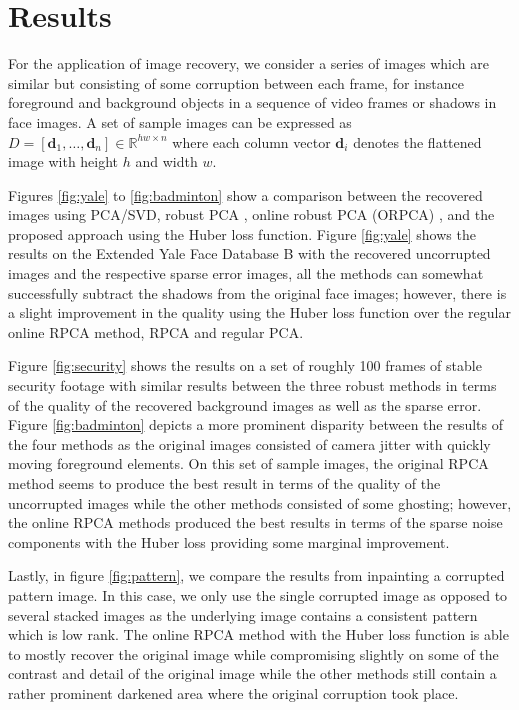 \documentclass[a4paper,11pt]{article}
\newcommand{\real}{\mathbb{R}}
\newcommand{\bd}{\mathbf{d}}
\begin{document}
\section{Results}
For the application of image recovery, we consider a series of images which are
similar but consisting of some corruption between each frame, for instance
foreground and background objects in a sequence of video frames or shadows in
face images. A set of sample images can be expressed as $D = [\bd_1, \dots,
\bd_n] \in \real^{hw \times n}$ where each column vector $\bd_i$ denotes the
flattened image with height $h$ and width $w$.

Figures \ref{fig:yale} to \ref{fig:badminton} show a comparison between the
recovered images using PCA/SVD, robust PCA \cite{NIPS2009}, online robust PCA
(ORPCA) \cite{FengORPCA}, and the proposed approach using the Huber loss
function. Figure \ref{fig:yale} shows the results on the Extended Yale Face
Database B \cite{cryale} with the recovered uncorrupted images and the
respective sparse error images, all the methods can somewhat successfully
subtract the shadows from the original face images; however, there is a slight
improvement in the quality using the Huber loss function over the regular
online RPCA method, RPCA and regular PCA.

Figure \ref{fig:security} shows the results on a set of roughly 100 frames of
stable security footage with similar results between the three robust methods
in terms of the quality of the recovered background images as well as the
sparse error. Figure \ref{fig:badminton} depicts a more prominent disparity
between the results of the four methods as the original images consisted of
camera jitter with quickly moving foreground elements. On this set of sample
images, the original RPCA method seems to produce the best result in terms of
the quality of the uncorrupted images while the other methods consisted of some
ghosting; however, the online RPCA methods produced the best results in terms
of the sparse noise components with the Huber loss providing some marginal
improvement.

Lastly, in figure \ref{fig:pattern}, we compare the results from inpainting a 
corrupted pattern image. In this case, we only use the single corrupted image 
as opposed to several stacked images as the underlying image contains a
consistent pattern which is low rank. The online RPCA method with the
Huber loss function is able to mostly recover the original image while
compromising slightly on some of the contrast and detail of the original image
while the other methods still contain a rather prominent darkened area where
the original corruption took place.
\end{document}
